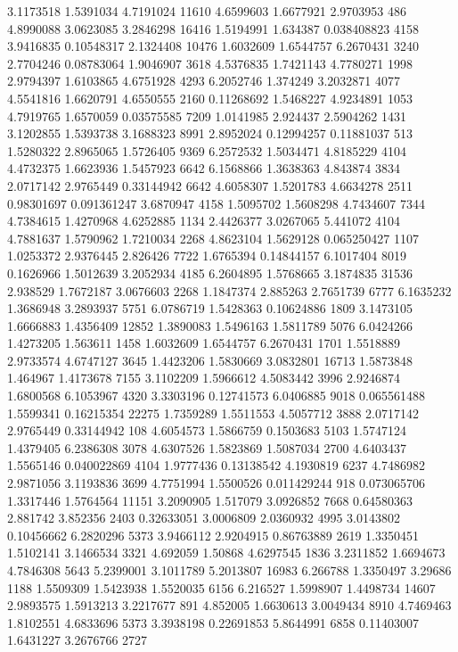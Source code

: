 3.1173518 1.5391034 4.7191024 11610
4.6599603 1.6677921 2.9703953 486
4.8990088 3.0623085 3.2846298 16416
1.5194991 1.634387 0.038408823 4158
3.9416835 0.10548317 2.1324408 10476
1.6032609 1.6544757 6.2670431 3240
2.7704246 0.08783064 1.9046907 3618
4.5376835 1.7421143 4.7780271 1998
2.9794397 1.6103865 4.6751928 4293
6.2052746 1.374249 3.2032871 4077
4.5541816 1.6620791 4.6550555 2160
0.11268692 1.5468227 4.9234891 1053
4.7919765 1.6570059 0.03575585 7209
1.0141985 2.924437 2.5904262 1431
3.1202855 1.5393738 3.1688323 8991
2.8952024 0.12994257 0.11881037 513
1.5280322 2.8965065 1.5726405 9369
6.2572532 1.5034471 4.8185229 4104
4.4732375 1.6623936 1.5457923 6642
6.1568866 1.3638363 4.843874 3834
2.0717142 2.9765449 0.33144942 6642
4.6058307 1.5201783 4.6634278 2511
0.98301697 0.091361247 3.6870947 4158
1.5095702 1.5608298 4.7434607 7344
4.7384615 1.4270968 4.6252885 1134
2.4426377 3.0267065 5.441072 4104
4.7881637 1.5790962 1.7210034 2268
4.8623104 1.5629128 0.065250427 1107
1.0253372 2.9376445 2.826426 7722
1.6765394 0.14844157 6.1017404 8019
0.1626966 1.5012639 3.2052934 4185
6.2604895 1.5768665 3.1874835 31536
2.938529 1.7672187 3.0676603 2268
1.1847374 2.885263 2.7651739 6777
6.1635232 1.3686948 3.2893937 5751
6.0786719 1.5428363 0.10624886 1809
3.1473105 1.6666883 1.4356409 12852
1.3890083 1.5496163 1.5811789 5076
6.0424266 1.4273205 1.563611 1458
1.6032609 1.6544757 6.2670431 1701
1.5518889 2.9733574 4.6747127 3645
1.4423206 1.5830669 3.0832801 16713
1.5873848 1.464967 1.4173678 7155
3.1102209 1.5966612 4.5083442 3996
2.9246874 1.6800568 6.1053967 4320
3.3303196 0.12741573 6.0406885 9018
0.065561488 1.5599341 0.16215354 22275
1.7359289 1.5511553 4.5057712 3888
2.0717142 2.9765449 0.33144942 108
4.6054573 1.5866759 0.1503683 5103
1.5747124 1.4379405 6.2386308 3078
4.6307526 1.5823869 1.5087034 2700
4.6403437 1.5565146 0.040022869 4104
1.9777436 0.13138542 4.1930819 6237
4.7486982 2.9871056 3.1193836 3699
4.7751994 1.5500526 0.011429244 918
0.073065706 1.3317446 1.5764564 11151
3.2090905 1.517079 3.0926852 7668
0.64580363 2.881742 3.852356 2403
0.32633051 3.0006809 2.0360932 4995
3.0143802 0.10456662 6.2820296 5373
3.9466112 2.9204915 0.86763889 2619
1.3350451 1.5102141 3.1466534 3321
4.692059 1.50868 4.6297545 1836
3.2311852 1.6694673 4.7846308 5643
5.2399001 3.1011789 5.2013807 16983
6.266788 1.3350497 3.29686 1188
1.5509309 1.5423938 1.5520035 6156
6.216527 1.5998907 1.4498734 14607
2.9893575 1.5913213 3.2217677 891
4.852005 1.6630613 3.0049434 8910
4.7469463 1.8102551 4.6833696 5373
3.3938198 0.22691853 5.8644991 6858
0.11403007 1.6431227 3.2676766 2727
